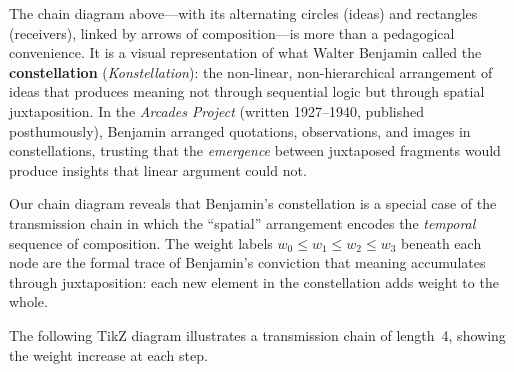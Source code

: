 \begin{interpretation}
\label{interp:ch8:chain_diagram_benjamin}
The chain diagram above---with its alternating circles (ideas) and rectangles
(receivers), linked by arrows of composition---is more than a pedagogical
convenience.  It is a visual representation of what Walter Benjamin called
the \textbf{constellation} (\emph{Konstellation}): the non-linear,
non-hierarchical arrangement of ideas that produces meaning not through
sequential logic but through spatial juxtaposition.  In the \emph{Arcades
Project} (written 1927--1940, published posthumously), Benjamin arranged
quotations, observations, and images in constellations, trusting that the
\emph{emergence} between juxtaposed fragments would produce insights that
linear argument could not.

Our chain diagram reveals that Benjamin's constellation is a special case of
the transmission chain in which the ``spatial'' arrangement encodes the
\emph{temporal} sequence of composition.  The weight labels $w_0 \leq w_1
\leq w_2 \leq w_3$ beneath each node are the formal trace of Benjamin's
conviction that meaning accumulates through juxtaposition: each new element
in the constellation adds weight to the whole.
\end{interpretation}



The following TikZ diagram illustrates a transmission chain of length~4,
showing the weight increase at each step.

